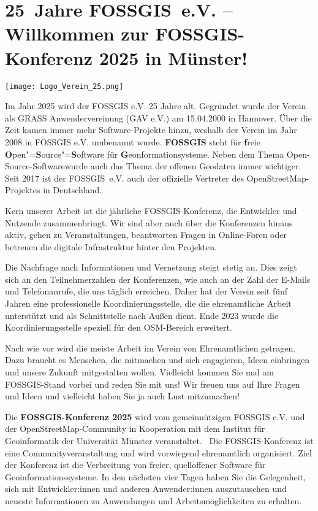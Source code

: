 \newpage
\section*{25~Jahre FOSSGIS~e.V. -- Willkommen zur FOSSGIS-Konferenz 2025 in Münster!}\label{welcome}

\begin{flushright}
\texttt{[image: Logo\_Verein\_25.png]}
\end{flushright}

\noindent
Im Jahr 2025 wird der FOSSGIS e.V. 25 Jahre alt. Gegründet wurde der Verein als
GRASS Anwendervereinung (GAV e.V.) am 15.04.2000 in Hannover. Über die Zeit
kamen immer mehr Software-Projekte hinzu, weshalb der Verein im Jahr 2008 in
FOSSGIS e.V. umbenannt wurde. {\bfseries  FOSSGIS} steht für {\bfseries f}reie
{\bfseries O}pen"={\bfseries S}ource"={\bfseries S}oftware für
{\bfseries G}eonformationsysteme.
Neben dem Thema \glqq Open-Source-Software\grqq wurde auch das
Thema der offenen Geodaten immer wichtiger. Seit 2017 ist der FOSSGIS~e.V.
auch der offizielle Vertreter des OpenStreetMap-Projektes in Deutschland.

\noindent
Kern unserer Arbeit ist die jährliche FOSSGIS-Konferenz, die Entwickler und
Nutzende zusammenbringt. Wir sind aber auch über die Konferenzen hinaus aktiv,
gehen zu Veranstaltungen, beantworten Fragen in Online-Foren oder betreuen
die digitale Infrastruktur hinter den Projekten.

\pagebreak
\noindent
Die Nachfrage nach Informationen und Vernetzung steigt stetig an. Dies zeigt sich
an den Teilnehmerzahlen der Konferenzen, wie auch an der Zahl der E-Mails und
Telefonanrufe, die uns täglich erreichen. Daher hat der Verein seit fünf Jahren
eine professionelle Koordinierungsstelle, die die ehrenamtliche Arbeit
unterstützt und als Schnittstelle nach Außen dient. Ende 2023 wurde die
Koordinierungsstelle speziell für den OSM-Bereich erweitert.

\noindent
Nach wie vor wird die meiste Arbeit im Verein von Ehrenamtlichen getragen.
Dazu braucht es Menschen, die mitmachen und sich engagieren, Ideen einbringen
und unsere Zukunft mitgestalten wollen. Vielleicht kommen Sie mal am
FOSSGIS-Stand vorbei und reden Sie mit uns! Wir freuen uns auf Ihre Fragen und
Ideen und vielleicht haben Sie ja auch Lust mitzumachen!

\noindent
Die {\bfseries FOSSGIS-Konferenz 2025} wird vom gemeinnützigen FOSSGIS e.V. und der
OpenStreetMap-Community in Kooperation mit dem Institut für Geoinformatik der
Universität Münster veranstaltet. 
Die FOSSGIS-Konferenz ist eine Communityveranstaltung und wird vorwiegend
ehrenamtlich organisiert.
Ziel der Konferenz ist die Verbreitung von freier, quelloffener Software für
Geoinformationssysteme. In den nächsten vier Tagen haben Sie die Gelegenheit,
sich mit Entwickler:innen und anderen Anwender:innen auszutauschen und
neueste Informationen zu Anwendungen und Arbeitsmöglichkeiten zu erhalten.

